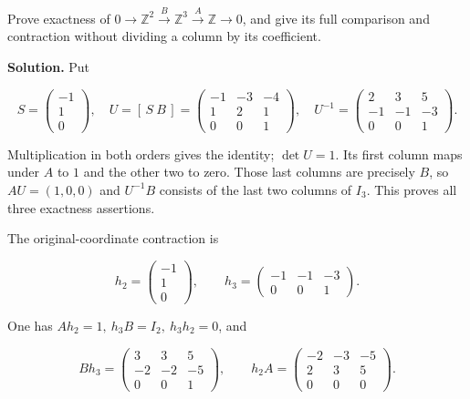 Prove exactness of \(0\to\mathbb Z^2\xrightarrow B\mathbb Z^3\xrightarrow A\mathbb Z\to0\), and give its full comparison and contraction without dividing a column by its coefficient.

\textbf{Solution.} Put

\begin{equation}
S=\begin{pmatrix}-1\\1\\0\end{pmatrix},\quad
 U=[\,S\ B\,]=
 \begin{pmatrix}-1&-3&-4\\1&2&1\\0&0&1\end{pmatrix},\quad
 U^{-1}=\begin{pmatrix}2&3&5\\-1&-1&-3\\0&0&1\end{pmatrix}.
 \label{courseIII:integral-handle-chains-and-signed-incidences:eq:8.2}
\end{equation}

Multiplication in both orders gives the identity; \(\det U=1\). Its first column maps under \(A\) to \(1\) and the other two to zero. Those last columns are precisely \(B\), so \(AU=(1,0,0)\) and \(U^{-1}B\) consists of the last two columns of \(I_3\). This proves all three exactness assertions.

The original-coordinate contraction is

\begin{equation}
h_2=\begin{pmatrix}-1\\1\\0\end{pmatrix},\qquad
 h_3=\begin{pmatrix}-1&-1&-3\\0&0&1\end{pmatrix}.
 \label{courseIII:integral-handle-chains-and-signed-incidences:eq:8.3}
\end{equation}

One has \(Ah_2=1,\ h_3B=I_2,\ h_3h_2=0\), and

\begin{equation}
Bh_3=\begin{pmatrix}3&3&5\\-2&-2&-5\\0&0&1\end{pmatrix},
 \qquad
 h_2A=\begin{pmatrix}-2&-3&-5\\2&3&5\\0&0&0\end{pmatrix}.
 \label{courseIII:integral-handle-chains-and-signed-incidences:eq:8.4}
\end{equation}

